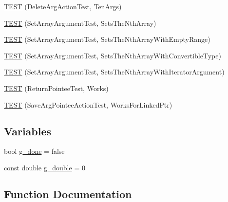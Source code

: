 \begin{DoxyCompactItemize}
\item 
\mbox{\hyperlink{namespacetesting_1_1gmock__more__actions__test_a972b47a7e96b95606190afa928ea2db4}{T\+E\+ST}} (Delete\+Arg\+Action\+Test, Ten\+Args)
\item 
\mbox{\hyperlink{namespacetesting_1_1gmock__more__actions__test_aacf568e3d16b210aa2316ccc2cb6b22d}{T\+E\+ST}} (Set\+Array\+Argument\+Test, Sets\+The\+Nth\+Array)
\item 
\mbox{\hyperlink{namespacetesting_1_1gmock__more__actions__test_a63a338ef41086b80dba5729ecd1073e5}{T\+E\+ST}} (Set\+Array\+Argument\+Test, Sets\+The\+Nth\+Array\+With\+Empty\+Range)
\item 
\mbox{\hyperlink{namespacetesting_1_1gmock__more__actions__test_a42955fc99954c095f9d7ded3b92c091f}{T\+E\+ST}} (Set\+Array\+Argument\+Test, Sets\+The\+Nth\+Array\+With\+Convertible\+Type)
\item 
\mbox{\hyperlink{namespacetesting_1_1gmock__more__actions__test_a5db6a5413414f6d9bb8a24d1f07bf882}{T\+E\+ST}} (Set\+Array\+Argument\+Test, Sets\+The\+Nth\+Array\+With\+Iterator\+Argument)
\item 
\mbox{\hyperlink{namespacetesting_1_1gmock__more__actions__test_a690ef20bd9c281781eddcf99b18cff6c}{T\+E\+ST}} (Return\+Pointee\+Test, Works)
\item 
\mbox{\hyperlink{namespacetesting_1_1gmock__more__actions__test_afc168d80fe8ca16f0efc874587574e64}{T\+E\+ST}} (Save\+Arg\+Pointee\+Action\+Test, Works\+For\+Linked\+Ptr)
\end{DoxyCompactItemize}
\subsection*{Variables}
\begin{DoxyCompactItemize}
\item 
bool \mbox{\hyperlink{namespacetesting_1_1gmock__more__actions__test_ab2d168581c62c89bd00cdadcccd9e8e4}{g\+\_\+done}} = false
\item 
const double \mbox{\hyperlink{namespacetesting_1_1gmock__more__actions__test_a73552112032ff5d5900dd6f128a62718}{g\+\_\+double}} = 0
\end{DoxyCompactItemize}


\subsection{Function Documentation}
\mbox{\label{namespacetesting_1_1gmock__more__actions__test_ad772cefe4443030c4b50e0d497d0edbb}} 
